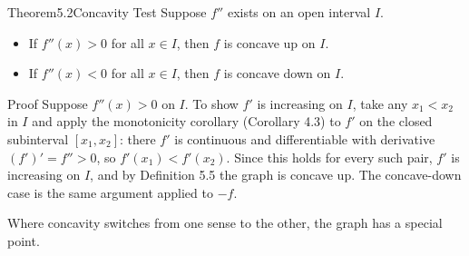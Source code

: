\documentclass[a4paper,12pt,oneside]{memoir}
\begin{document}
\begin{envtheorem}{Theorem}{5.2}{Concavity Test}
Suppose \(f''\) exists on an open interval \(I\).

\begin{itemize}
  \item If \(f''(x) > 0\) for all \(x \in I\), then \(f\) is concave up on \(I\).
  \item If \(f''(x) < 0\) for all \(x \in I\), then \(f\) is concave down on \(I\).
\end{itemize}
\end{envtheorem}
\begin{envproof}{Proof}{}{}
Suppose \(f''(x) > 0\) on \(I\). To show \(f'\) is increasing on \(I\), take any \(x_{1} < x_{2}\) in \(I\) and apply the monotonicity corollary (Corollary 4.3) to \(f'\) on the closed subinterval \([x_{1}, x_{2}]\): there \(f'\) is continuous and differentiable with derivative \((f')' = f'' > 0\), so \(f'(x_{1}) < f'(x_{2})\). Since this holds for every such pair, \(f'\) is increasing on \(I\), and by Definition 5.5 the graph is concave up. The concave-down case is the same argument applied to \(-f\). \qedmark
\end{envproof}
Where concavity switches from one sense to the other, the graph has a special point.
\end{document}
